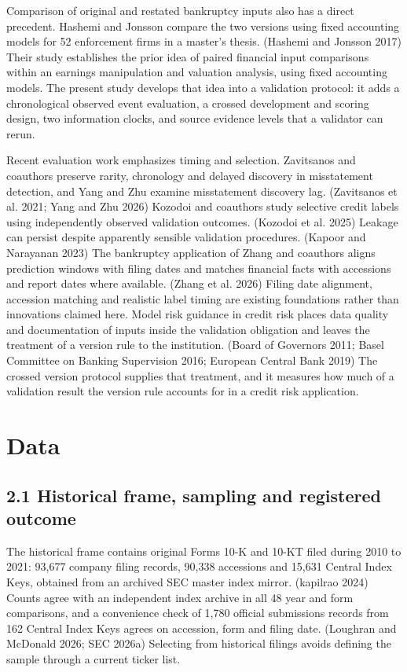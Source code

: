 \documentclass[10pt,a4paper,twocolumn]{article}
\begin{document}
Comparison of original and restated bankruptcy inputs also has a direct precedent. Hashemi and Jonsson compare the two versions using fixed accounting models for 52 enforcement firms in a master's thesis. (Hashemi and Jonsson 2017) Their study establishes the prior idea of paired financial input comparisons within an earnings manipulation and valuation analysis, using fixed accounting models. The present study develops that idea into a validation protocol: it adds a chronological observed event evaluation, a crossed development and scoring design, two information clocks, and source evidence levels that a validator can rerun.

Recent evaluation work emphasizes timing and selection. Zavitsanos and coauthors preserve rarity, chronology and delayed discovery in misstatement detection, and Yang and Zhu examine misstatement discovery lag. (Zavitsanos et al. 2021; Yang and Zhu 2026) Kozodoi and coauthors study selective credit labels using independently observed validation outcomes. (Kozodoi et al. 2025) Leakage can persist despite apparently sensible validation procedures. (Kapoor and Narayanan 2023) The bankruptcy application of Zhang and coauthors aligns prediction windows with filing dates and matches financial facts with accessions and report dates where available. (Zhang et al. 2026) Filing date alignment, accession matching and realistic label timing are existing foundations rather than innovations claimed here. Model risk guidance in credit risk places data quality and documentation of inputs inside the validation obligation and leaves the treatment of a version rule to the institution. (Board of Governors 2011; Basel Committee on Banking Supervision 2016; European Central Bank 2019) The crossed version protocol supplies that treatment, and it measures how much of a validation result the version rule accounts for in a credit risk application.
\section{Data}
\subsection{2.1 Historical frame, sampling and registered outcome}

The historical frame contains original Forms 10-K and 10-KT filed during 2010 to 2021: 93,677 company filing records, 90,338 accessions and 15,631 Central Index Keys, obtained from an archived SEC master index mirror. (kapilrao 2024) Counts agree with an independent index archive in all 48 year and form comparisons, and a convenience check of 1,780 official submissions records from 162 Central Index Keys agrees on accession, form and filing date. (Loughran and McDonald 2026; SEC 2026a) Selecting from historical filings avoids defining the sample through a current ticker list.
\end{document}
